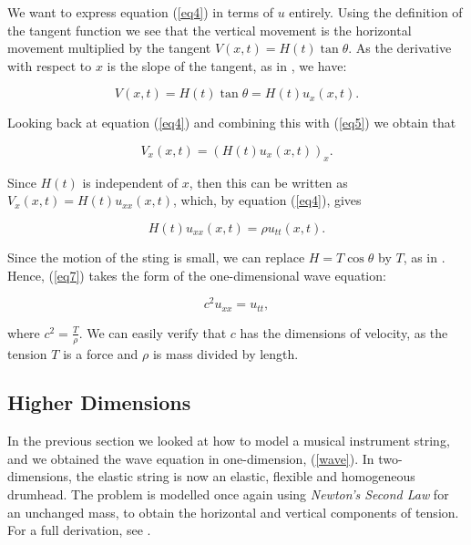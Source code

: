 \documentclass[a4paper, 12pt]{article}
\numberwithin{equation}{section}
\begin{document}
We want to express equation (\ref{eq4}) in terms of $u$ entirely. Using the
definition of the tangent function we see that the vertical movement is the
horizontal movement multiplied by the tangent $V(x, t)=H(t)\tan{\theta}$. As the
derivative with respect to $x$ is the slope of the tangent, as in \cite[Ch.
9]{Spi}, we have:

\begin{equation} \label{eq5}
    V(x,t)=H(t)\tan{\theta}=H(t)u_x(x,t).
\end{equation}

Looking back at equation (\ref{eq4}) and combining this with (\ref{eq5}) we
obtain that

\begin{equation*} 
    V_x(x,t)=(H(t)u_x(x,t))_x.
\end{equation*}

Since $H(t)$ is independent of $x$, then this can be written as
$V_x(x,t)=H(t)u_{xx}(x,t)$, which, by equation (\ref{eq4}), gives

\begin {equation} \label{eq7}
    H(t)u_{xx}(x, t)=\rho u_{tt}(x,t).
\end{equation}

Since the motion of the sting is small, we can replace $H=T\cos{\theta}$ by $T$,
as in \cite[Ch. 10, App. B]{BoyDiP}. Hence, (\ref{eq7}) takes the form of the
one-dimensional wave equation:

\begin{equation} \label{wave}
    c^2u_{xx}=u_{tt}, 
\end{equation}

where $c^2=\frac{T}{\rho}$. We can easily verify that $c$ has the dimensions of
velocity, as the tension $T$ is a force and $\rho$ is mass divided by length.

\subsection{Higher Dimensions} \label{twodim}
In the previous section we looked at how to model a musical instrument string,
and we obtained the wave equation in one-dimension, (\ref{wave}). In
two-dimensions, the elastic string is now an elastic, flexible and homogeneous
drumhead. The problem is modelled once again using \emph{Newton's Second Law}
for an unchanged mass, to obtain the horizontal and vertical components of
tension. For a full derivation, see \cite[Ch. 12.8]{Kr}.
\\
\end{document}
